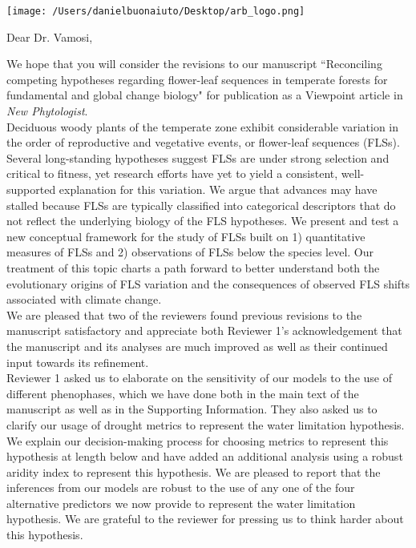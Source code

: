 \documentclass{article}[11pt]
\begin{document}

\def\labelitemi{--}
\parindent=24pt
\noindent\texttt{[image: /Users/danielbuonaiuto/Desktop/arb\_logo.png]}




\vspace{2.5ex}

\noindent Dear Dr. Vamosi,\\ 
  
  \vspace{1.5ex}

\noindent We hope that you will consider the revisions to our manuscript ``Reconciling competing hypotheses regarding flower-leaf sequences in temperate forests for fundamental and global change biology" for publication as a Viewpoint article in \emph{New Phytologist}.\\

\noindent Deciduous woody plants of the temperate zone exhibit considerable variation in the order of reproductive and vegetative events, or flower-leaf sequences (FLSs). Several long-standing hypotheses suggest FLSs are under strong selection and critical to fitness, yet research efforts have yet to yield a consistent, well-supported explanation for this variation. We argue that advances may have stalled because FLSs are typically classified into categorical descriptors that do not reflect the underlying biology of the FLS hypotheses. We present and test a new conceptual framework for the study of FLSs built on 1) quantitative measures of FLSs and 2) observations of FLSs below the species level. Our treatment of this topic charts a path forward to better understand both the evolutionary origins of FLS variation and the consequences of observed FLS shifts associated with climate change.\\

\noindent We are pleased that two of the reviewers found previous revisions to the manuscript satisfactory and appreciate both Reviewer 1's acknowledgement that the manuscript and its analyses are much improved as well as their continued input towards its refinement.\\ 

\noindent Reviewer 1 asked us to elaborate on the sensitivity of our models to the use of different phenophases, which we have done both in the main text of the manuscript as well as in the Supporting Information. They also asked us to clarify our usage of drought metrics to represent the water limitation hypothesis. We explain our decision-making process for choosing metrics to represent this hypothesis at length below and have added an additional analysis using a robust aridity index to represent this hypothesis. We are pleased to report that the inferences from our models are robust to the use of any one of the four alternative predictors we now provide to represent the water limitation hypothesis. We are grateful to the reviewer for pressing us to think harder about this hypothesis.\\
\end{document}
